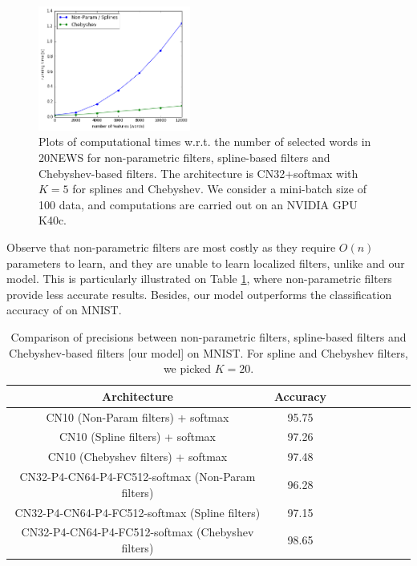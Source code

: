 \documentclass{article}
\begin{document}
\begin{figure}[h!]
\centering
\includegraphics[width=5cm]{images/speed.png}
\caption{Plots of computational times w.r.t. the number of selected words in 20NEWS for non-parametric filters, spline-based filters \cite{art:HenaffBrunaLeCun15DLgraphs} and Chebyshev-based filters. The architecture is CN32+softmax with $K=5$ for splines and Chebyshev. We consider a mini-batch size of 100 data, and computations are carried out on an NVIDIA GPU K40c.}
\label{fig2}
\end{figure}







\noindent
Observe that non-parametric filters are most costly as they require $O(n)$ parameters to learn, and they are unable to learn localized filters, unlike \cite{art:HenaffBrunaLeCun15DLgraphs} and our model. This is particularly illustrated on Table \ref{tab6}, where non-parametric filters provide less accurate results. Besides, our model outperforms the classification accuracy of \cite{art:HenaffBrunaLeCun15DLgraphs} on MNIST.


\begin{table}[h!]
 \centering
{\small
\begin{tabular}{|c|c|c|c|c|c|c|c|c|}
\hline
 Architecture & Accuracy  \\
\hline
CN10 (Non-Param filters) + softmax & 95.75 \\
CN10 (Spline filters)  + softmax & 97.26 \\
CN10 (Chebyshev filters)  + softmax & 97.48 \\
CN32-P4-CN64-P4-FC512-softmax  (Non-Param filters) & 96.28 \\
CN32-P4-CN64-P4-FC512-softmax  (Spline filters) & 97.15 \\
CN32-P4-CN64-P4-FC512-softmax  (Chebyshev filters) & 98.65 \\
\hline
\end{tabular}
}
\caption{Comparison of precisions between non-parametric filters, spline-based filters \cite{art:HenaffBrunaLeCun15DLgraphs} and Chebyshev-based filters [our model] on MNIST. For spline and Chebyshev filters, we picked $K=20$.} 
\label{tab6}
\end{table}
\end{document}
